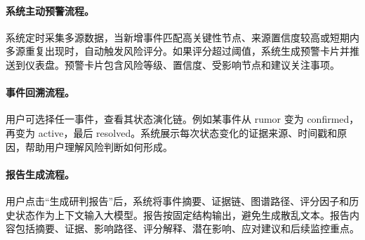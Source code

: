 \documentclass[12pt,a4paper]{article}
\begin{document}
\paragraph{系统主动预警流程。}系统定时采集多源数据，当新增事件匹配高关键性节点、来源置信度较高或短期内多源重复出现时，自动触发风险评分。如果评分超过阈值，系统生成预警卡片并推送到仪表盘。预警卡片包含风险等级、置信度、受影响节点和建议关注事项。

\paragraph{事件回溯流程。}用户可选择任一事件，查看其状态演化链。例如某事件从 rumor 变为 confirmed，再变为 active，最后 resolved。系统展示每次状态变化的证据来源、时间戳和原因，帮助用户理解风险判断如何形成。

\paragraph{报告生成流程。}用户点击“生成研判报告”后，系统将事件摘要、证据链、图谱路径、评分因子和历史状态作为上下文输入大模型。报告按固定结构输出，避免生成散乱文本。报告内容包括摘要、证据、影响路径、评分解释、潜在影响、应对建议和后续监控重点。
\end{document}
